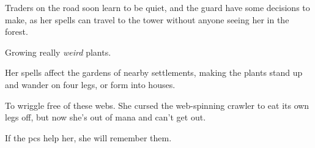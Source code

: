 \begin{multicols}{2}
\begin{dlist}
  Traders on the road soon learn to be quiet, and the \gls{guard} have some decisions to make, as her spells can travel to the tower without anyone seeing her in the forest.
  \item
  Growing really \emph{weird} plants.

  Her spells affect the gardens of nearby settlements, making the plants stand up and wander on four legs, or form into houses.
  \item
  To wriggle free of these webs.
  She cursed the web-spinning \gls{crawler} to eat its own legs off, but now she's out of mana and can't get out.

  If the \glspl{pc} help her, she will remember them.
\end{dlist}

\end{multicols}

\section{}
\label{hag}

